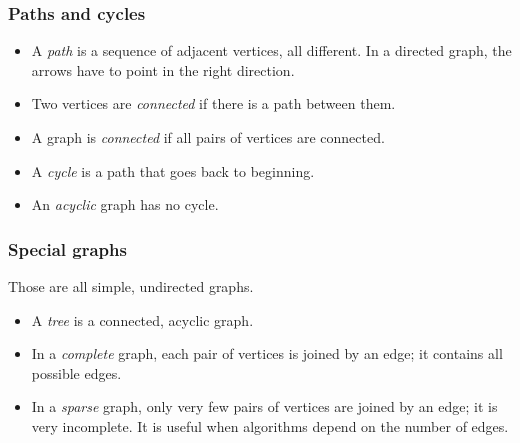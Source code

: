 \subsubsection{Paths and cycles}

\begin{itemize}
    \item A \emph{path} is a sequence of adjacent vertices, all different.
        In a directed graph, the arrows have to point in the right direction.
    \item Two vertices are \emph{connected} if there is a path between them.
    \item A graph is \emph{connected} if all pairs of vertices are connected.
    \item A \emph{cycle} is a path that goes back to beginning.
    \item An \emph{acyclic} graph has no cycle.
\end{itemize}

\subsubsection{Special graphs}

Those are all simple, undirected graphs.
\begin{itemize}
    \item A \emph{tree} is a connected, acyclic graph.
    \item In a \emph{complete} graph, each pair of vertices is joined by an
        edge; it contains all possible edges.
    \item In a \emph{sparse} graph, only very few pairs of vertices
        are joined by an edge; it is very incomplete.
        It is useful when algorithms depend on the number of
        edges.
\end{itemize}
